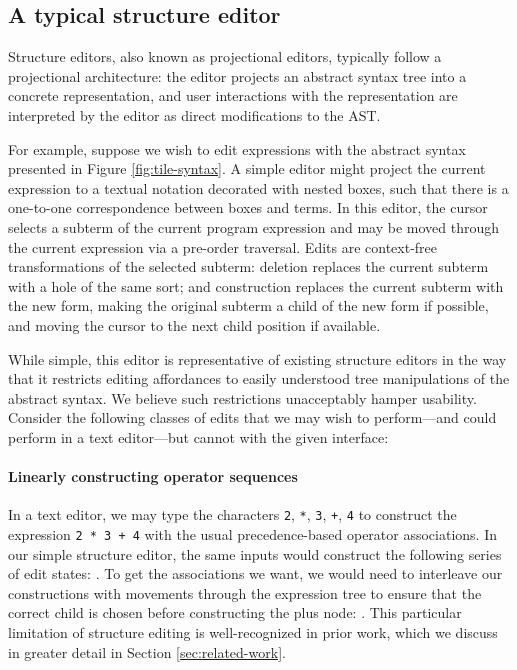 \subsection{A typical structure editor} \label{sec:simple-editor}

Structure editors, also known as projectional editors, typically
follow a projectional architecture: the editor projects an
abstract syntax tree into a concrete representation,
and user interactions with the representation are interpreted
by the editor as direct modifications to the AST.

For example, suppose we wish to edit expressions with the abstract
syntax presented in Figure \ref{fig:tile-syntax}.
A simple editor might project the current expression
to a textual notation decorated with nested boxes, such
that there is a one-to-one correspondence between
boxes and terms. 
In this editor, the cursor selects a subterm of the
current program expression and may be moved through
the current expression via a pre-order traversal.
Edits are context-free transformations
of the selected subterm:
  deletion replaces the current subterm with
    a hole of the same sort; and
  construction replaces the current subterm
    with the new form, making the original subterm
    a child of the new form if possible, and moving
    the cursor to the next child position if available.

While simple, this editor is representative of existing structure
editors in the way that it restricts editing affordances to easily
understood tree manipulations of the abstract syntax.
We believe such restrictions unacceptably hamper usability.
Consider the following classes of edits that we may wish to
perform---and could perform in a text editor---but cannot with the
given interface:

\paragraph{Linearly constructing operator sequences}
In a text editor, we may type the characters \texttt{2}, \texttt{*},
\texttt{3}, \texttt{+}, \texttt{4}
to construct the expression \texttt{2 * 3 + 4} with
the usual precedence-based operator associations.
In our simple structure editor, the same inputs would construct
the following series of edit states: .
To get the associations we want, we would need to interleave
our constructions with movements through the expression tree
to ensure that the correct child is chosen before constructing
the plus node: .
This particular limitation of structure editing is well-recognized
in prior work, which we discuss in greater detail in Section
\ref{sec:related-work}.

